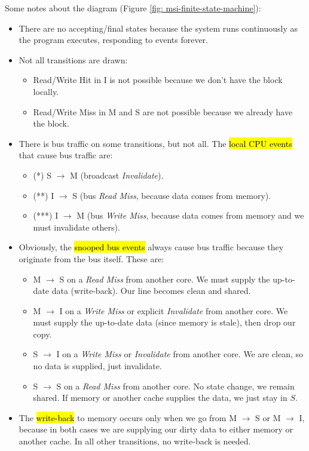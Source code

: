Some notes about the diagram (Figure \ref{fig: msi-finite-state-machine}):
\begin{itemize}
    \item There are no accepting/final states because the system runs continuously as the program executes, responding to events forever.
    \item Not all transitions are drawn:
    \begin{itemize}
        \item Read/Write Hit in I is not possible because we don't have the block locally.
        \item Read/Write Miss in M and S are not possible because we already have the block.
    \end{itemize}
    \item There is bus traffic on some transitions, but not all. The \hl{local CPU events} that cause bus traffic are:
    \begin{itemize}
        \item (*) S $\to$ M (broadcast \emph{Invalidate}).
        \item (**) I $\to$ S (bus \emph{Read Miss}, because data comes from memory).
        \item (***) I $\to$ M (bus \emph{Write Miss}, because data comes from memory and we must invalidate others).
    \end{itemize}
    \item Obviously, the \hl{snooped bus events} always cause bus traffic because they originate from the bus itself. These are:
    \begin{itemize}
        \item M $\to$ S on a \emph{Read Miss} from another core. We must supply the up-to-date data (write-back). Our line becomes clean and shared.
        \item M $\to$ I on a \emph{Write Miss} or explicit \emph{Invalidate} from another core. We must supply the up-to-date data (since memory is stale), then drop our copy.
        \item S $\to$ I on a \emph{Write Miss} or \emph{Invalidate} from another core. We are clean, so no data is supplied, just invalidate.
        \item S $\to$ S on a \emph{Read Miss} from another core. No state change, we remain shared. If memory or another cache supplies the data, we just stay in $S$.
    \end{itemize}
    \item The \hl{write-back} to memory occurs only when we go from M $\to$ S or M $\to$ I, because in both cases we are supplying our dirty data to either memory or another cache. In all other transitions, no write-back is needed.
\end{itemize}
